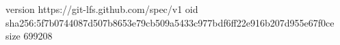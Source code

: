 version https://git-lfs.github.com/spec/v1
oid sha256:5f7b0744087d507b8653e79cb509a5433c977bdf6ff22e916b207d955e67f0ce
size 699208
